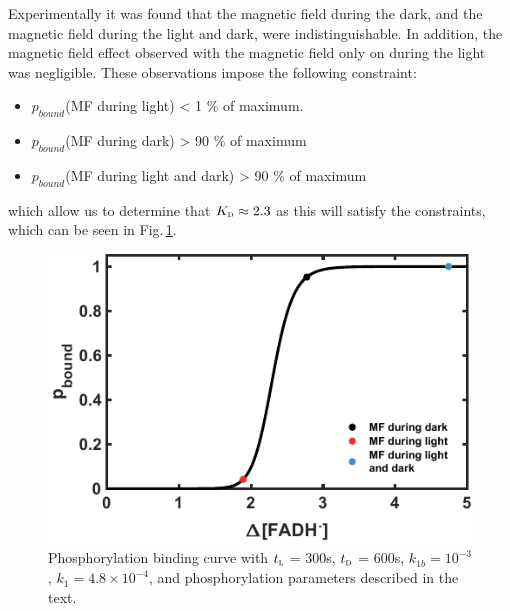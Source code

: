 \documentclass[twoside,twocolumn,9pt]{article}
\begin{document}
Experimentally it was found that the magnetic field during the dark, and the magnetic field during the light and dark, were indistinguishable. \cite{Pooam2019} In addition, the magnetic field effect observed with the magnetic field only on during the light was negligible. These observations impose the following constraint:
\begin{itemize}
	\item $p_{bound}$(MF during light) < 1 \% of maximum.
	\item $p_{bound}$(MF during dark) > 90 \% of maximum
	\item $p_{bound}$(MF during light and dark) > 90 \% of maximum
\end{itemize}
which allow us to determine that $K_{\textsc{d}} \approx 2.3$ as this will satisfy the constraints, which can be seen in Fig.\,\ref{fig:sigmoid}.
\begin{figure}[h]
	\centering
	\includegraphics{sigmoid.pdf}
	\caption{Phosphorylation binding curve with $t_{\textsc{l}}$ = 300s, $t_{\textsc{d}}$ = 600s, $k_{1b} = 10^{-3}$, $k_{1} = 4.8 \times 10^{-4}$, and phosphorylation parameters described in the text.}
	\label{fig:sigmoid}
\end{figure}
\end{document}

